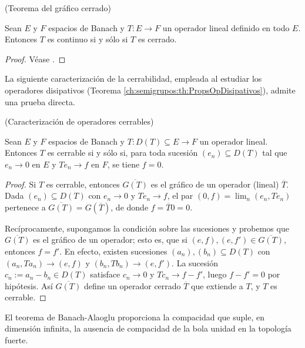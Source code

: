 \begin{Teorema}{(Teorema del gráfico cerrado)}
\label{ch:preliminares:th:graficoCerrado}

Sean $E$ y $F$ espacios de Banach y $T : E \rightarrow F$ un operador lineal
definido en todo $E$. Entonces $T$ es continuo si y sólo si $T$ es cerrado.
\end{Teorema}

\begin{proof}
Véase \cite[Teorema~2.9]{brezis-2011-fun-ana-sob}.
\end{proof}

La siguiente caracterización de la cerrabilidad, empleada al estudiar los
operadores disipativos (Teorema \ref{ch:semigrupos:th:PropsOpDisipativos}),
admite una prueba directa.\\

\begin{Proposicion}{(Caracterización de operadores cerrables)}
\label{ch:preliminares:prop:cerrable}

Sean $E$ y $F$ espacios de Banach y $T : D(T) \subseteq E \rightarrow F$ un
operador lineal. Entonces $T$ es cerrable si y sólo si, para toda sucesión
$(e_n) \subseteq D(T)$ tal que $e_n \rightarrow 0$ en $E$ y $Te_n \rightarrow f$
en $F$, se tiene $f = 0$.
\end{Proposicion}

\begin{proof}
Si $T$ es cerrable, entonces $\overline{G(T)}$ es el gráfico de un operador
(lineal) $\overline{T}$. Dada $(e_n) \subseteq D(T)$ con $e_n \rightarrow 0$ y
$Te_n \rightarrow f$, el par $(0, f) = \lim_n (e_n, Te_n)$ pertenece a
$\overline{G(T)} = G(\overline{T})$, de donde $f = \overline{T}0 = 0$.

Recíprocamente, supongamos la condición sobre las sucesiones y probemos que
$\overline{G(T)}$ es el gráfico de un operador; esto es, que si
$(e, f), (e, f') \in \overline{G(T)}$, entonces $f = f'$. En efecto, existen
sucesiones $(a_n), (b_n) \subseteq D(T)$ con $(a_n, Ta_n) \rightarrow (e, f)$ y
$(b_n, Tb_n) \rightarrow (e, f')$. La sucesión $c_n := a_n - b_n \in D(T)$
satisface $c_n \rightarrow 0$ y $Tc_n \rightarrow f - f'$, luego $f - f' = 0$ por
hipótesis. Así $\overline{G(T)}$ define un operador cerrado $\overline{T}$ que
extiende a $T$, y $T$ es cerrable.
\end{proof}

El teorema de Banach-Alaoglu proporciona la compacidad que suple, en dimensión
infinita, la ausencia de compacidad de la bola unidad en la topología fuerte.\\

